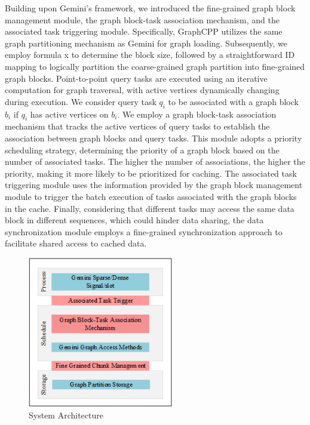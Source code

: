 \documentclass[lettersize,journal]{IEEEtran} %
\begin{document}
Building upon Gemini’s framework, we introduced the fine-grained graph block management module, the graph block-task association mechanism, and the associated task triggering module. Specifically, GraphCPP utilizes the same graph partitioning mechanism as Gemini for graph loading. Subsequently, we employ formula x to determine the block size, followed by a straightforward ID mapping to logically partition the coarse-grained graph partition into fine-grained graph blocks. Point-to-point query tasks are executed using an iterative computation for graph traversal, with active vertices dynamically changing during execution. We consider query task $q_i$ to be associated with a graph block $b_i$ if $q_i$ has active vertices on $b_i$. We employ a graph block-task association mechanism that tracks the active vertices of query tasks to establish the association between graph blocks and query tasks. This module adopts a priority scheduling strategy, determining the priority of a graph block based on the number of associated tasks. The higher the number of associations, the higher the priority, making it more likely to be prioritized for caching. The associated task triggering module uses the information provided by the graph block management module to trigger the batch execution of tasks associated with the graph blocks in the cache. Finally, considering that different tasks may access the same data block in different sequences, which could hinder data sharing, the data synchronization module employs a fine-grained synchronization approach to facilitate shared access to cached data.


\begin{figure}[!t]
\centering
\includegraphics[width=2.5in]{viso插图}
\caption{System Architecture}  
\label{viso插图}
\end{figure}
 
\end{document}
